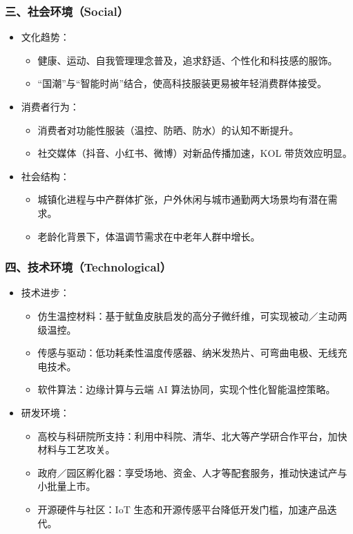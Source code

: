 \documentclass[UTF8]{report}
\theoremstyle{MyLineTheoremStyle} %
\theoremstyle{MyBlockTheoremStyle} %
\theoremstyle{MySubsubsectionStyle} %
\begin{document}
    \subsubsection{三、社会环境（Social）}
        \begin{itemize}
            \item 文化趋势：
                \begin{itemize}
                    \item 健康、运动、自我管理理念普及，追求舒适、个性化和科技感的服饰。
                    \item “国潮”与“智能时尚”结合，使高科技服装更易被年轻消费群体接受。
                \end{itemize}
            \item 消费者行为：
                \begin{itemize}
                    \item 消费者对功能性服装（温控、防晒、防水）的认知不断提升。
                    \item 社交媒体（抖音、小红书、微博）对新品传播加速，KOL 带货效应明显。
                \end{itemize}
            \item 社会结构：
                \begin{itemize}
                    \item 城镇化进程与中产群体扩张，户外休闲与城市通勤两大场景均有潜在需求。
                    \item 老龄化背景下，体温调节需求在中老年人群中增长。
                \end{itemize}
        \end{itemize}

    \subsubsection{四、技术环境（Technological）}
        \begin{itemize}
            \item 技术进步：
                \begin{itemize}
                    \item 仿生温控材料：基于鱿鱼皮肤启发的高分子微纤维，可实现被动／主动两级温控。
                    \item 传感与驱动：低功耗柔性温度传感器、纳米发热片、可弯曲电极、无线充电技术。
                    \item 软件算法：边缘计算与云端 AI 算法协同，实现个性化智能温控策略。
                \end{itemize}
            \item 研发环境：
                \begin{itemize}
                    \item 高校与科研院所支持：利用中科院、清华、北大等产学研合作平台，加快材料与工艺攻关。
                    \item 政府／园区孵化器：享受场地、资金、人才等配套服务，推动快速试产与小批量上市。
                    \item 开源硬件与社区：IoT 生态和开源传感平台降低开发门槛，加速产品迭代。
                \end{itemize}
        \end{itemize}
\end{document}
